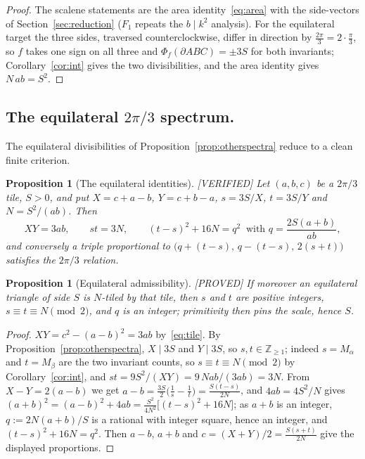 \documentclass[11pt,reqno]{amsart}
\theoremstyle{plain}
\newtheorem{proposition}[theorem]{Proposition}
\theoremstyle{definition}
\newcommand{\Z}{\mathbb{Z}}
\newcommand{\lab}[1]{\hfill\textnormal{\footnotesize\textsc{[#1]}}}
\begin{document}
\begin{proof}
The scalene statements are the area identity~\eqref{eq:area} with the side-vectors of
Section~\ref{sec:reduction} ($F_1$ repeats the $b\mid k^2$ analysis). For the equilateral target
the three sides, traversed counterclockwise, differ in direction by $\frac{2\pi}3=2\cdot\frac\pi3$,
so $f$ takes one sign on all three and $\Phi_f(\partial ABC)=\pm3S$ for both invariants;
Corollary~\ref{cor:int} gives the two divisibilities, and the area identity gives $N\,ab=S^2$.
\end{proof}

\subsection*{The equilateral $2\pi/3$ spectrum.}
The equilateral divisibilities of Proposition~\ref{prop:otherspectra} reduce to a clean finite
criterion.

\begin{proposition}[The equilateral identities]\label{prop:eqspec}\lab{VERIFIED}
Let $(a,b,c)$ be a $2\pi/3$ tile, $S>0$, and put $X=c+a-b$, $Y=c+b-a$, $s=3S/X$, $t=3S/Y$ and
$N=S^2/(ab)$. Then
\[
XY=3ab,\qquad st=3N,\qquad (t-s)^2+16N=q^2\ \text{ with } q=\frac{2S(a+b)}{ab},
\]
and conversely a triple proportional to $\bigl(q+(t-s),\,q-(t-s),\,2(s+t)\bigr)$ satisfies the
$2\pi/3$ relation.
\end{proposition}

\begin{proposition}[Equilateral admissibility]\label{prop:eqspecint}\lab{PROVED}
If moreover an equilateral triangle of side $S$ is $N$-tiled by that tile, then $s$ and $t$ are
positive integers, $s\equiv t\equiv N\pmod 2$, and $q$ is an integer; primitivity then pins the
scale, hence $S$.
\end{proposition}

\begin{proof}
$XY=c^2-(a-b)^2=3ab$ by~\eqref{eq:tile}. By Proposition~\ref{prop:otherspectra}, $X\mid 3S$ and
$Y\mid 3S$, so $s,t\in\Z_{\ge1}$; indeed $s=M_\alpha$ and $t=M_\beta$ are the two invariant
counts, so $s\equiv t\equiv N\pmod2$ by Corollary~\ref{cor:int}, and
$st=9S^2/(XY)=9\,Nab/(3ab)=3N$. From $X-Y=2(a-b)$ we get
$a-b=\tfrac{3S}{2}\bigl(\tfrac1s-\tfrac1t\bigr)=\tfrac{S(t-s)}{2N}$, and $4ab=4S^2/N$ gives
$(a+b)^2=(a-b)^2+4ab=\tfrac{S^2}{4N^2}\bigl[(t-s)^2+16N\bigr]$; as $a+b$ is an integer,
$q:=2N(a+b)/S$ is a rational with integer square, hence an integer, and
$(t-s)^2+16N=q^2$. Then $a-b$, $a+b$ and $c=(X+Y)/2=\tfrac{S(s+t)}{2N}$ give the displayed
proportions.
\end{proof}
\end{document}
